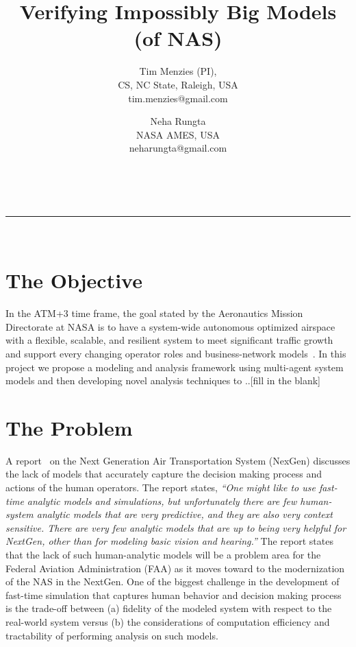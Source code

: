 \documentclass[12pt]{article}
\begin{document}
 
\vspace{-1cm}
\title{ Verifying Impossibly Big Models (of NAS)} 
\author{Tim Menzies (PI),\\
CS, NC State, Raleigh, USA\\
tim.menzies@gmail.com
\and
Neha Rungta\\
NASA AMES, USA\\
neharungta@gmail.com}
\date{}
\maketitle
\vspace{-0.75cm}
~\hrule~\newline

\section{The Objective}

In the ATM+3 time frame, the goal stated by the Aeronautics Mission Directorate at NASA is to have a system-wide autonomous optimized airspace with a flexible, scalable, and resilient system to meet significant traffic growth and support every changing operator roles and business-network models~\cite{cavolowsky:aiaa}. In this project we propose a  modeling and analysis framework using multi-agent system models and then developing novel analysis techniques to ..[fill in the blank]


\section{The Problem}
A report~\cite{nrc:nextgen} on the Next Generation Air Transportation System (NexGen) discusses the lack of models that accurately capture the decision making process and actions of the human operators. The report states, \emph{``One might like to use fast-time analytic models and simulations, but unfortunately there are few human-system analytic models that are very predictive, and they are also very context sensitive. There are very
few analytic models that are up to being very helpful for NextGen, other than for modeling basic vision and hearing.''} The report states that the lack of such
human-analytic models will be a problem area for the Federal Aviation Administration (FAA) as it moves toward to the modernization of the NAS in the NextGen. One of the biggest challenge in the development of fast-time simulation that captures human behavior and decision making process is the trade-off between (a) fidelity of the modeled system with respect to the real-world system versus (b) the considerations of computation efficiency and tractability of performing analysis on such models.
\end{document}
